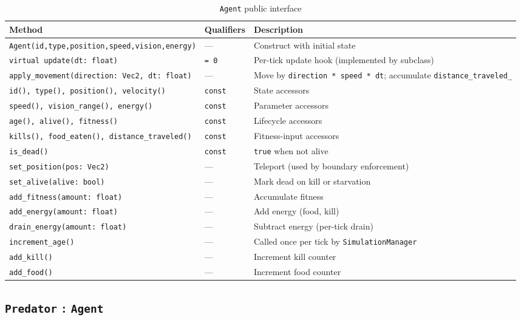 \begin{table}[H]
\centering\small
\caption{\texttt{Agent} public interface}
\begin{tabularx}{\textwidth}{@{}llX@{}}
\toprule
\textbf{Method} & \textbf{Qualifiers} & \textbf{Description} \\
\midrule
\texttt{Agent(id,type,position,speed,vision,energy)} & — & Construct with initial state \\
\texttt{virtual update(dt: float)} & \texttt{= 0} & Per-tick update hook (implemented by subclass) \\
\texttt{apply\_movement(direction: Vec2, dt: float)} & — & Move by \texttt{direction * speed * dt}; accumulate \texttt{distance\_traveled\_} \\
\midrule
\texttt{id(), type(), position(), velocity()} & \texttt{const} & State accessors \\
\texttt{speed(), vision\_range(), energy()} & \texttt{const} & Parameter accessors \\
\texttt{age(), alive(), fitness()} & \texttt{const} & Lifecycle accessors \\
\texttt{kills(), food\_eaten(), distance\_traveled()} & \texttt{const} & Fitness-input accessors \\
\texttt{is\_dead()} & \texttt{const} & \texttt{true} when not alive \\
\midrule
\texttt{set\_position(pos: Vec2)} & — & Teleport (used by boundary enforcement) \\
\texttt{set\_alive(alive: bool)} & — & Mark dead on kill or starvation \\
\texttt{add\_fitness(amount: float)} & — & Accumulate fitness \\
\texttt{add\_energy(amount: float)} & — & Add energy (food, kill) \\
\texttt{drain\_energy(amount: float)} & — & Subtract energy (per-tick drain) \\
\texttt{increment\_age()} & — & Called once per tick by \texttt{SimulationManager} \\
\texttt{add\_kill()} & — & Increment kill counter \\
\texttt{add\_food()} & — & Increment food counter \\
\bottomrule
\end{tabularx}
\end{table}

\subsection{\texttt{Predator} : \texttt{Agent}}

